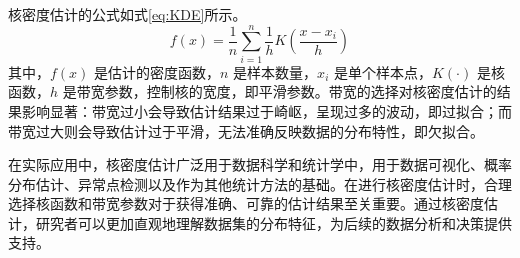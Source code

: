 核密度估计的公式如式\eqref{eq:KDE}所示。
\begin{equation}
    f(x) = \frac{1}{n}\sum_{i=1}^{n} \frac{1}{h}K\left(\frac{x-x_i}{h}\right)
    \label{eq:KDE}
\end{equation}
其中，\(f(x)\) 是估计的密度函数，\(n\) 是样本数量，\(x_i\) 是单个样本点，\(K(\cdot)\) 是核函数，\(h\) 是带宽参数，控制核的宽度，即平滑参数。带宽的选择对核密度估计的结果影响显著：带宽过小会导致估计结果过于崎岖，呈现过多的波动，即过拟合；而带宽过大则会导致估计过于平滑，无法准确反映数据的分布特性，即欠拟合。

在实际应用中，核密度估计广泛用于数据科学和统计学中，用于数据可视化、概率分布估计、异常点检测以及作为其他统计方法的基础。在进行核密度估计时，合理选择核函数和带宽参数对于获得准确、可靠的估计结果至关重要。通过核密度估计，研究者可以更加直观地理解数据集的分布特征，为后续的数据分析和决策提供支持。

